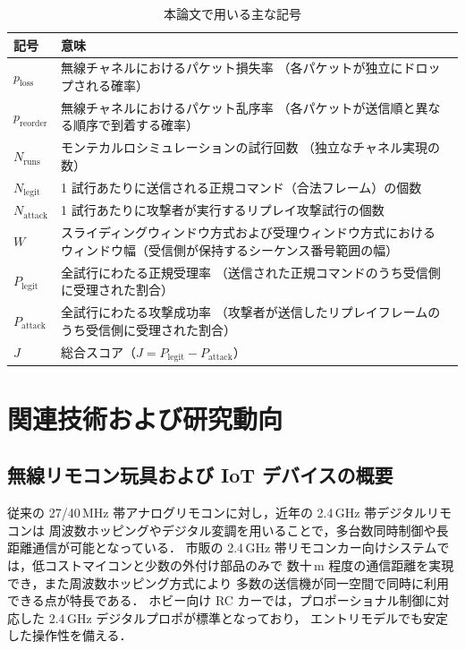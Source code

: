 \documentclass[twocolumn,10pt,a4paper]{jsarticle}
\begin{document}
\begin{table}[tb]
\centering
\caption{本論文で用いる主な記号}
\label{tab:notation}
\begin{tabular}{l p{55mm}}
\hline
記号 & 意味 \\
\hline
$p_{\mathrm{loss}}$ &
無線チャネルにおけるパケット損失率
（各パケットが独立にドロップされる確率） \\[0.5ex]

$p_{\mathrm{reorder}}$ &
無線チャネルにおけるパケット乱序率
（各パケットが送信順と異なる順序で到着する確率） \\[0.5ex]

$N_{\mathrm{runs}}$ &
モンテカルロシミュレーションの試行回数
（独立なチャネル実現の数） \\[0.5ex]

$N_{\mathrm{legit}}$ &
1 試行あたりに送信される正規コマンド（合法フレーム）の個数 \\[0.5ex]

$N_{\mathrm{attack}}$ &
1 試行あたりに攻撃者が実行するリプレイ攻撃試行の個数 \\[0.5ex]

$W$ &
スライディングウィンドウ方式および受理ウィンドウ方式における
ウィンドウ幅（受信側が保持するシーケンス番号範囲の幅） \\[0.5ex]

$P_{\mathrm{legit}}$ &
全試行にわたる正規受理率
（送信された正規コマンドのうち受信側に受理された割合） \\[0.5ex]

$P_{\mathrm{attack}}$ &
全試行にわたる攻撃成功率
（攻撃者が送信したリプレイフレームのうち受信側に受理された割合） \\[0.5ex]

$J$ &
総合スコア（$J = P_{\mathrm{legit}} - P_{\mathrm{attack}}$）\\
\hline
\end{tabular}
\end{table}

\section{関連技術および研究動向}

\subsection{無線リモコン玩具および IoT デバイスの概要}

従来の 27/40\,MHz 帯アナログリモコンに対し，近年の 2.4\,GHz 帯デジタルリモコンは
周波数ホッピングやデジタル変調を用いることで，多台数同時制御や長距離通信が可能となっている．
市販の 2.4\,GHz 帯リモコンカー向けシステムでは，低コストマイコンと少数の外付け部品のみで
数十\,m 程度の通信距離を実現でき，また周波数ホッピング方式により
多数の送信機が同一空間で同時に利用できる点が特長である\cite{RC2p4GSlides,TamiyaRCGuide}．
ホビー向け RC カーでは，プロポーショナル制御に対応した 2.4\,GHz デジタルプロポが標準となっており，
エントリモデルでも安定した操作性を備える\cite{TamiyaRCGuide,EURORC2025}．
\end{document}
